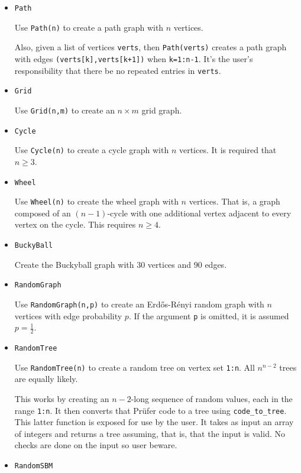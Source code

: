 \documentclass[oneside]{amsart}
\begin{document}
\begin{itemize}
\item \verb|Path|

  Use \verb|Path(n)| to create a path graph with $n$ vertices.

  Also, given a list of vertices \verb|verts|, then \verb|Path(verts)|
  creates a path graph with edges \verb|(verts[k],verts[k+1])| when
  \verb|k=1:n-1|. It's the user's responsibility that there be no
  repeated entries in \verb|verts|.

\item \verb|Grid|

  Use \verb|Grid(n,m)| to create an $n\times m$ grid graph.

\item \verb|Cycle|

  Use \verb|Cycle(n)| to create a cycle graph with $n$ vertices. It is
  required that $n\ge3$.

\item \verb|Wheel|

  Use \verb|Wheel(n)| to create the wheel graph with $n$
  vertices. That is, a graph composed of an $(n-1)$-cycle with one
  additional vertex adjacent to every vertex on the cycle. This
  requires $n\ge4$.


\item \verb|BuckyBall|

  Create the Buckyball graph with $30$ vertices and $90$ edges.


\item \verb|RandomGraph|

  Use \verb|RandomGraph(n,p)| to create an Erd\H{o}s-R\'enyi random
  graph with $n$ vertices with edge probability $p$. If the argument
  \verb|p| is omitted, it is assumed $p=\frac12$.

\item \verb|RandomTree|

  Use \verb|RandomTree(n)| to create a random tree on vertex set
  \verb|1:n|. All $n^{n-2}$ trees are equally likely.

  This works by creating an $n-2$-long sequence of random values, each
  in the range \verb|1:n|. It then converts that Pr\"ufer code to a
  tree using \verb|code_to_tree|. This latter function is exposed for
  use by the user. It takes as input an array of integers and returns
  a tree assuming, that is, that the input is valid. No checks are
  done on the input so user beware.

\item \verb|RandomSBM|


\end{itemize}
\end{document}
